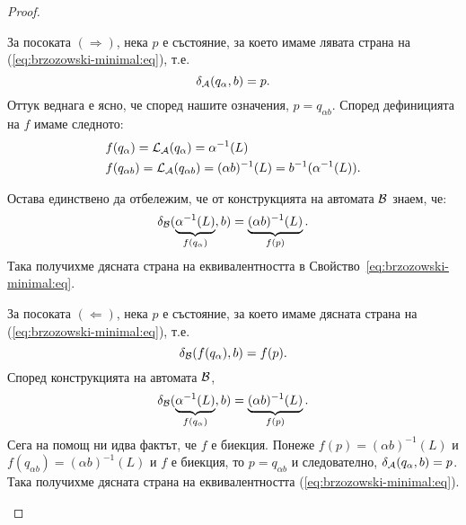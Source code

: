 \begin{proof}
\begin{itemize}
    За посоката $(\Rightarrow)$, нека $p$ е състояние, за което имаме лявата страна на (\ref{eq:brzozowski-minimal:eq}), т.е.
    \[\delta_{\mathcal{A}}(q_\alpha,b) = p.\]
    Оттук веднага е ясно, че според нашите означения, $p = q_{\alpha b}$.
    Според дефиницията на $f$ имаме следното:
    \begin{align*}
      & f(q_{\alpha}) = \mathcal{L}_{\mathcal{A}}(q_\alpha) = \alpha^{-1}(L)\\
      & f(q_{\alpha b}) = \mathcal{L}_{\mathcal{A}}(q_{\alpha b}) = (\alpha b)^{-1}(L) = b^{-1}(\alpha^{-1}(L)).
    \end{align*}




    Остава единствено да отбележим, че от конструкцията на автомата $\mathcal{B}$ знаем, че:
    \[\delta_{\mathcal{B}}(\underbrace{\alpha^{-1}(L)}_{f(q_{\alpha})},b) = \underbrace{(\alpha b)^{-1}(L)}_{f(p)}.\]
    Така получихме дясната страна на еквивалентността в Свойство~\ref{eq:brzozowski-minimal:eq}.
    
    За посоката $(\Leftarrow)$, нека $p$ е състояние, за което имаме дясната страна на (\ref{eq:brzozowski-minimal:eq}), т.е.
    \[\delta_{\mathcal{B}}(f(q_{\alpha}),b) = f(p).\]
    Според конструкцията на автомата $\mathcal{B}$,
    \[\delta_{\mathcal{B}}(\underbrace{\alpha^{-1}(L)}_{f(q_\alpha)},b) = \underbrace{(\alpha b)^{-1}(L)}_{f(p)}.\]
    Сега на помощ ни идва фактът, че $f$ е биекция.
    Понеже $f(p) = (\alpha b)^{-1}(L)$ и $f(q_{\alpha b}) = (\alpha b)^{-1}(L)$ и $f$ е биекция, то
    $p = q_{\alpha b}$ и следователно, $\delta_{\mathcal{A}}(q_\alpha, b) = p$.
    Така получихме дясната страна на еквивалентността (\ref{eq:brzozowski-minimal:eq}).
  \end{itemize}
\end{proof}


